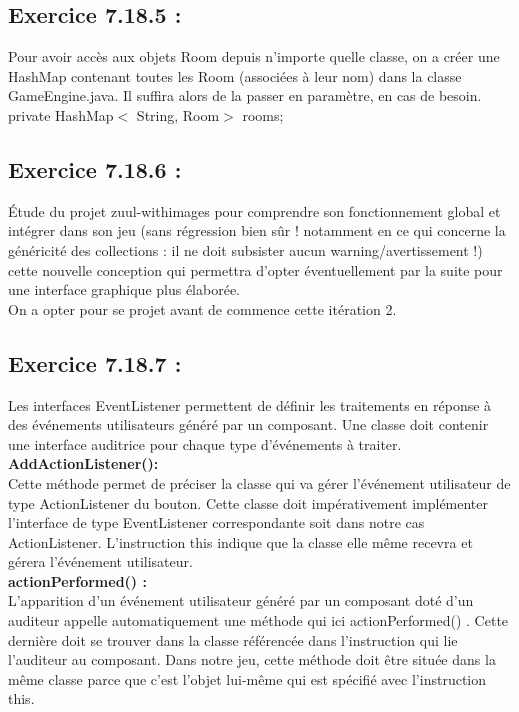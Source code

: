 \documentclass[french,10pt,a4paper]{report}
\begin{document}
\subsection{\textcolor{bb}{Exercice 7.18.5 :}}
Pour avoir accès aux objets Room depuis n'importe quelle classe, on a créer une HashMap contenant toutes les Room (associées à leur nom) dans la classe GameEngine.java. Il suffira alors de la passer en paramètre, en cas de besoin.
\\
\textcolor{gg}{private} \textcolor{bb}{HashMap$<$ String, Room$>$} rooms;

\subsection{\textcolor{bb}{Exercice 7.18.6 :}}
Étude du projet zuul-withimages pour comprendre son fonctionnement global et intégrer dans son jeu (sans régression bien sûr ! notamment en ce qui concerne la généricité des collections : il ne doit subsister aucun warning/avertissement !) cette nouvelle conception qui permettra d'opter éventuellement par la suite pour une interface graphique plus élaborée.\\
On a opter pour se projet avant de commence cette itération 2.

\subsection{\textcolor{bb}{Exercice 7.18.7 :}}
Les interfaces EventListener permettent de définir les traitements en réponse à des événements utilisateurs généré par un composant. Une classe doit contenir une interface auditrice pour chaque type d'événements à traiter.\\
\textbf{AddActionListener():}\\
Cette méthode permet de préciser la classe qui va gérer l'événement utilisateur de type ActionListener du bouton. Cette classe doit impérativement implémenter l'interface de type EventListener correspondante soit dans notre cas ActionListener. L'instruction this indique que la classe elle même recevra et gérera l'événement utilisateur.\\
\textbf{actionPerformed() :}\\
L'apparition d'un événement utilisateur généré par un composant doté d'un auditeur appelle automatiquement une méthode qui ici  actionPerformed() . Cette dernière doit se trouver dans la classe référencée dans l'instruction qui lie l'auditeur au composant. Dans notre jeu, cette méthode doit être située dans la même classe parce que c'est l'objet lui-même qui est spécifié avec l'instruction this. 
\end{document}
